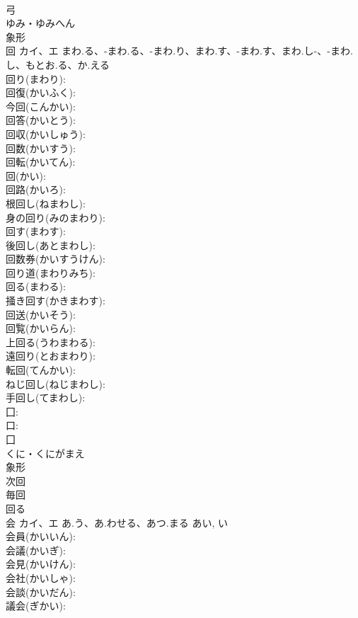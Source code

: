 \documentclass[8pt]{extreport}
\begin{document}
\begin{CJK}{UTF8}{min}
\\	弓	
\\	ゆみ・ゆみへん	
\\	象形 
\\	回	カイ、エ	まわ.る、-まわ.る、-まわ.り、まわ.す、-まわ.す、まわ.し-、-まわ.し、もとお.る、か.える		
\\	回り(まわり): 
\\	回復(かいふく): 
\\	今回(こんかい): 
\\	回答(かいとう): 
\\	回収(かいしゅう): 
\\	回数(かいすう): 
\\	回転(かいてん): 
\\	回(かい): 
\\	回路(かいろ): 
\\	根回し(ねまわし): 
\\	身の回り(みのまわり): 
\\	回す(まわす): 
\\	後回し(あとまわし): 
\\	回数券(かいすうけん): 
\\	回り道(まわりみち): 
\\	回る(まわる): 
\\	掻き回す(かきまわす): 
\\	回送(かいそう): 
\\	回覧(かいらん): 
\\	上回る(うわまわる): 
\\	遠回り(とおまわり): 
\\	転回(てんかい): 
\\	ねじ回し(ねじまわし): 
\\	手回し(てまわし): 
\\	囗: 
\\	口: 
\\	囗	
\\	くに・くにがまえ	
\\	象形 
\\	次回 
\\	毎回 
\\	回る 
\\	会	カイ、エ	あ.う、あ.わせる、あつ.まる	あい, い	
\\	会員(かいいん): 
\\	会議(かいぎ): 
\\	会見(かいけん): 
\\	会社(かいしゃ): 
\\	会談(かいだん): 
\\	議会(ぎかい): 

\end{CJK}
\end{document}
